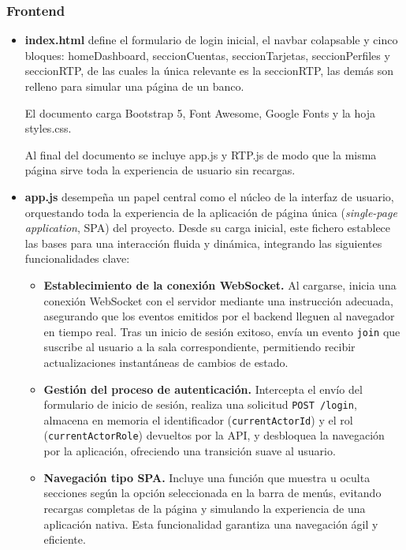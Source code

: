 \subsubsection{Frontend}
\label{subsubsec:Frontend}

\begin{itemize}
    \item \textbf{index.html} define el formulario de login inicial, el navbar colapsable y cinco bloques: homeDashboard, seccionCuentas, seccionTarjetas, seccionPerfiles y seccionRTP, de las cuales la única relevante es la seccionRTP, las demás son relleno para simular una página de un banco.
        
    El documento carga Bootstrap 5, Font Awesome, Google Fonts y la hoja styles.css.

    Al final del documento se incluye app.js y RTP.js de modo que la misma página sirve toda la experiencia de usuario sin recargas.
    \item \textbf{app.js} desempeña un papel central como el núcleo de la interfaz de usuario, orquestando toda la experiencia de la aplicación de página única (\textit{single-page application}, SPA) del proyecto. Desde su carga inicial, este fichero establece las bases para una interacción fluida y dinámica, integrando las siguientes funcionalidades clave:
        \begin{itemize}
            \item \textbf{Establecimiento de la conexión WebSocket.} Al cargarse, inicia una conexión WebSocket con el servidor mediante una instrucción adecuada, asegurando que los eventos emitidos por el backend lleguen al navegador en tiempo real. Tras un inicio de sesión exitoso, envía un evento \texttt{join} que suscribe al usuario a la sala correspondiente, permitiendo recibir actualizaciones instantáneas de cambios de estado.

            \item \textbf{Gestión del proceso de autenticación.} Intercepta el envío del formulario de inicio de sesión, realiza una solicitud \texttt{POST /login}, almacena en memoria el identificador (\texttt{currentActorId}) y el rol (\texttt{currentActorRole}) devueltos por la API, y desbloquea la navegación por la aplicación, ofreciendo una transición suave al usuario.

            \item \textbf{Navegación tipo SPA.} Incluye una función que muestra u oculta secciones según la opción seleccionada en la barra de menús, evitando recargas completas de la página y simulando la experiencia de una aplicación nativa. Esta funcionalidad garantiza una navegación ágil y eficiente.


\end{itemize}
\end{itemize}
